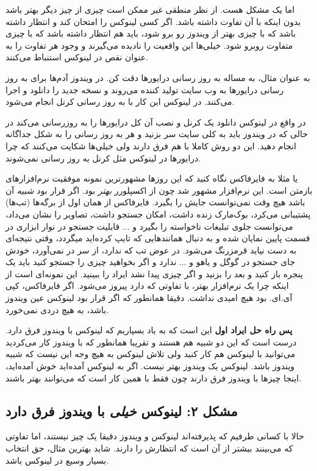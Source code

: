 اما یک مشکل هست. از نظر منطقی غیر ممکن است چیزی از چیز دیگر بهتر باشد بدون اینکه با آن تفاوت داشته باشد. اگر کسی لینوکس را امتحان کند و انتظار داشته باشد که با چیزی بهتر از ویندوز رو برو شود،‌ باید هم انتظار داشته باشد که با چیزی متفاوت روبرو شود. خیلی‌ها این واقعیت را نادیده می‌گیرند و وجود هر تفاوت را به عنوان نقص در لینوکس استنباط می‌کنند.

به عنوان مثال، به مساله به روز رسانی درایورها دقت کن. در ویندوز آدم‌ها برای به روز رسانی درایورها به وب سایت تولید کننده می‌روند و نسخه جدید را دانلود و اجرا می‌کنند. در لینوکس این کار با به روز رسانی کرنل انجام می‌شود.

در واقع در لینوکس دانلود یک کرنل و نصب آن کل درایورها را به روزرسانی می‌کند در حالی که در ویندوز باید به کلی سایت سر بزنید و هر به روز رسانی را به شکل جداگانه انجام دهید. این دو روش کاملا با هم فرق دارند ولی خیلی‌ها شکایت می‌کنند که چرا درایورها در لینوکس مثل کرنل به روز رسانی نمی‌شوند.

یا مثلا به فایرفاکس نگاه کنید که این روزها مشهورترین نمونه موفقیت نرم‌افزارهای بازمتن است. این نرم‌افزار مشهور شد چون از اکسپلورر
\emph{بهتر}
بود. اگر قرار بود
\emph{شبیه}
آن باشد هیچ وقت نمی‌توانست جایش را بگیرد. فایرفاکس از همان اول از برگه‌ها (تب‌ها) پشتیبانی می‌کرد، بوک‌مارک زنده داشت، امکان جستجو داشت، تصاویر 
 را نشان می‌داد، می‌توانست جلوی تبلیغات ناخواسته را بگیرد و ... قابلیت جستجو در نوار ابزاری در قسمت پایین نمایان شده و به دنبال همانندهایی که تایپ کرده‌اید میگردد، وقتی نتیجه‌ای به دست نیاید قرمزرنگ می‌شود. در عوض 
تب که ندارد، از 
 سر در نمی‌آورد، خودش جای جستجو در گوگل و یاهو و ... ندارد و اگر بخواهید چیزی را جستجو کنید باید یک پنجره باز کنید و بعد 
را بزنید و اگر چیزی پیدا نشد ایراد 
 را ببینید. این نمونه‌ای است از اینکه چرا یک نرم‌افزار بهتر، با تفاوتی که دارد پیروز می‌شود. اگر فایرفاکس، کپی آی.ای. بود هیچ امیدی نداشت. دقیقا همانطور که اگر قرار بود لینوکس عین ویندوز باشد، به هیچ دردی نمی‌خورد.

\textbf{پس راه حل ایراد اول}
این است که به یاد بسپاریم که لینوکس با ویندوز فرق دارد. درست است که این دو شبیه هم هستند و تقریبا همانطور که با ویندوز کار می‌کردید می‌توانید با لینوکس هم کار کنید ولی تلاش لینوکس به هیچ وجه این نیست که شبیه ویندوز باشد. لینوکس یک ویندوز بهتر نیست. اگر به لینوکس آمده‌اید خوش آمده‌اید، اینجا چیزها با ویندوز فرق دارند چون فقط با همین کار است که می‌توانند بهتر باشند.
\subsection*{مشکل ۲: لینوکس
\emph{خیلی}
با ویندوز فرق دارد}
حالا با کسانی طرفیم که پذیرفته‌اند لینوکس و ویندوز دقیقا یک چیز نیستند، اما تفاوتی که می‌بینند بیشتر از آن است که انتظارش را دارند. شاید بهترین مثال، حق انتخاب بسیار وسیع در لینوکس باشد.

